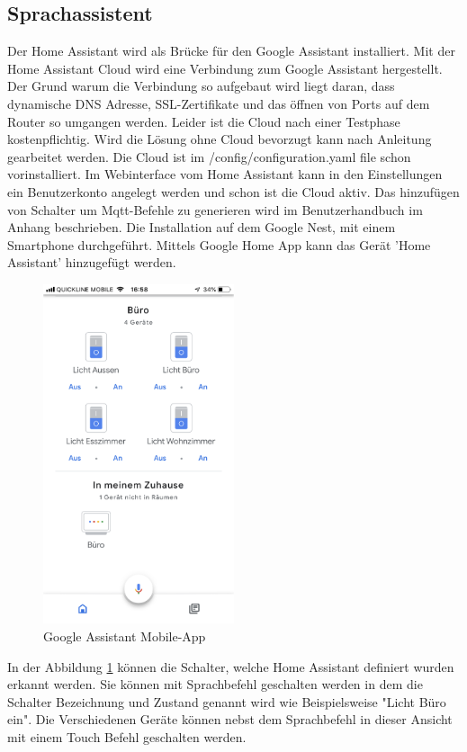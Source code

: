 \subsection{Sprachassistent}
Der Home Assistant wird als Brücke für den Google Assistant installiert. Mit der Home Assistant Cloud wird eine Verbindung zum Google Assistant hergestellt. Der Grund warum die Verbindung so aufgebaut wird liegt daran, dass dynamische DNS Adresse, SSL-Zertifikate und das öffnen von Ports auf dem Router so umgangen werden. Leider ist die Cloud nach einer Testphase kostenpflichtig. Wird die Lösung ohne Cloud bevorzugt kann nach Anleitung \cite{assistant_google_nodate} gearbeitet werden. Die Cloud ist im /config/configuration.yaml file schon vorinstalliert. Im Webinterface vom Home Assistant kann in den Einstellungen ein Benutzerkonto angelegt werden und schon ist die Cloud aktiv. Das hinzufügen von Schalter um Mqtt-Befehle zu generieren wird im Benutzerhandbuch im Anhang beschrieben. Die Installation auf dem Google Nest, mit einem Smartphone durchgeführt. Mittels Google Home App kann das Gerät 'Home Assistant' hinzugefügt werden.
\begin{figure}[H]
	\centering
	\includegraphics[width=0.5\textwidth]{graphics/GoogleAssistant.png}
	\caption{Google Assistant Mobile-App}
	\label{pic: GoogleAssistant}
\end{figure}   
In der Abbildung \ref{pic: GoogleAssistant} können die Schalter, welche Home Assistant definiert wurden erkannt werden. Sie können mit Sprachbefehl geschalten werden in dem die Schalter Bezeichnung und Zustand genannt wird wie Beispielsweise "Licht Büro ein". Die Verschiedenen Geräte können nebst dem Sprachbefehl in dieser Ansicht mit einem Touch Befehl geschalten werden.
